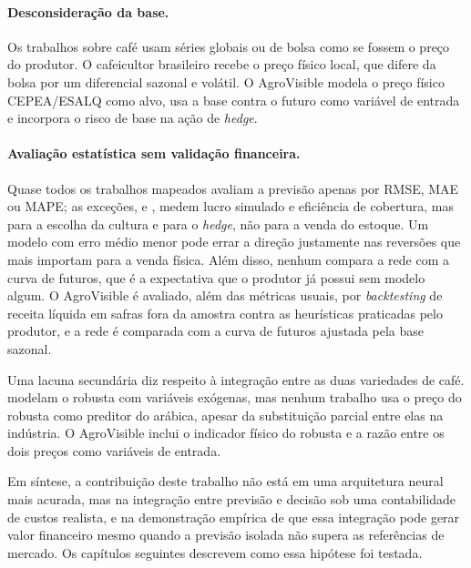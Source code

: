 \paragraph{Desconsideração da base.} Os trabalhos sobre café usam séries globais ou de bolsa como se fossem o preço do produtor. O cafeicultor brasileiro recebe o preço físico local, que difere da bolsa por um diferencial sazonal e volátil. O AgroVisible modela o preço físico CEPEA/ESALQ como alvo, usa a base contra o futuro como variável de entrada e incorpora o risco de base na ação de \textit{hedge}.

\paragraph{Avaliação estatística sem validação financeira.} Quase todos os trabalhos mapeados avaliam a previsão apenas por RMSE, MAE ou MAPE; as exceções,  e , medem lucro simulado e eficiência de cobertura, mas para a escolha da cultura e para o \textit{hedge}, não para a venda do estoque. Um modelo com erro médio menor pode errar a direção justamente nas reversões que mais importam para a venda física. Além disso, nenhum compara a rede com a curva de futuros, que é a expectativa que o produtor já possui sem modelo algum. O AgroVisible é avaliado, além das métricas usuais, por \textit{backtesting} de receita líquida em safras fora da amostra contra as heurísticas praticadas pelo produtor, e a rede é comparada com a curva de futuros ajustada pela base sazonal.

Uma lacuna secundária diz respeito à integração entre as duas variedades de café.  modelam o robusta com variáveis exógenas, mas nenhum trabalho usa o preço do robusta como preditor do arábica, apesar da substituição parcial entre elas na indústria. O AgroVisible inclui o indicador físico do robusta e a razão entre os dois preços como variáveis de entrada.

Em síntese, a contribuição deste trabalho não está em uma arquitetura neural mais acurada, mas na integração entre previsão e decisão sob uma contabilidade de custos realista, e na demonstração empírica de que essa integração pode gerar valor financeiro mesmo quando a previsão isolada não supera as referências de mercado. Os capítulos seguintes descrevem como essa hipótese foi testada.
